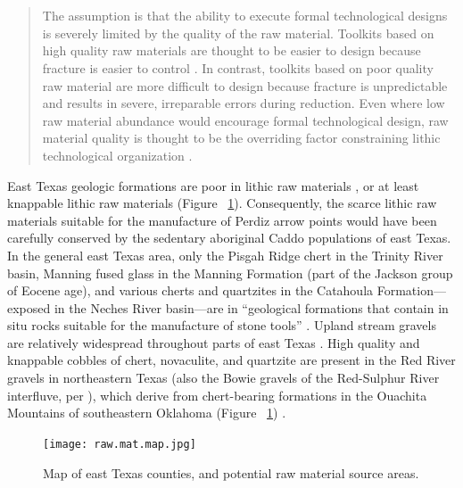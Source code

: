 \documentclass[review]{elsarticle}
\begin{document}
\linenumbers

\section*{}

\begin{quote}
The assumption is that the ability to execute formal technological designs is severely limited by the quality of the raw material. Toolkits based on high quality raw materials are thought to be easier to design because fracture is easier to control \citep{RN4315,RN8924}. In contrast, toolkits based on poor quality raw material are more difficult to design because fracture is unpredictable and results in severe, irreparable errors during reduction. Even where low raw material abundance would encourage formal technological design, raw material quality is thought to be the overriding factor constraining lithic technological organization \citep[257]{RN5907}.
\end{quote}

East Texas geologic formations are poor in lithic raw materials \citep[Figure 2.1]{RN439}, or at least knappable lithic raw materials (Figure ~\ref{fig:raw.map}). Consequently, the scarce lithic raw materials suitable for the manufacture of Perdiz arrow points would have been carefully conserved by the sedentary aboriginal Caddo populations of east Texas. In the general east Texas area, only the Pisgah Ridge chert in the Trinity River basin, Manning fused glass in the Manning Formation (part of the Jackson group of Eocene age), and various cherts and quartzites in the Catahoula Formation---exposed in the Neches River basin---are in “geological formations that contain in situ rocks suitable for the manufacture of stone tools” \citep[49]{RN439}. Upland stream gravels are relatively widespread throughout parts of east Texas \citep[56-57]{RN439}. High quality and knappable cobbles of chert, novaculite, and quartzite are present in the Red River gravels in northeastern Texas (also the Bowie gravels of the Red-Sulphur River interfluve, per \citet{RN846}), which derive from chert-bearing formations in the Ouachita Mountains of southeastern Oklahoma (Figure ~\ref{fig:raw.map}) \citep[Figure 1.20]{RN439}.

\begin{figure}[!]\centering
\texttt{[image: raw.mat.map.jpg]}
\caption{Map of east Texas counties, and potential raw material source areas.}
\label{fig:raw.map}
\end{figure}
\end{document}
